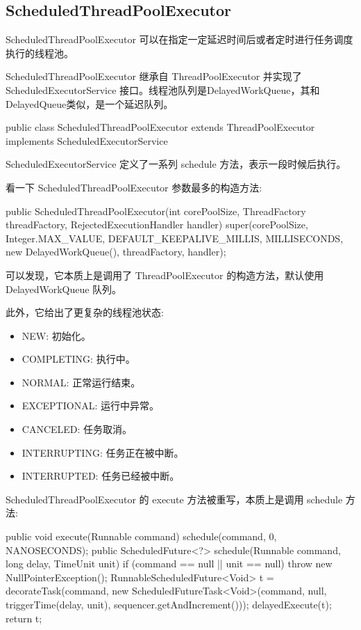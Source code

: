 \subsection{ScheduledThreadPoolExecutor}

ScheduledThreadPoolExecutor 可以在指定一定延迟时间后或者定时进行任务调度执行的线程池。

ScheduledThreadPoolExecutor 继承自 ThreadPoolExecutor 并实现了 ScheduledExecutorService 接口。线程池队列是DelayedWorkQueue，其和DelayedQueue类似，是一个延迟队列。

\begin{Java}
public class ScheduledThreadPoolExecutor extends ThreadPoolExecutor implements ScheduledExecutorService
\end{Java}

ScheduledExecutorService 定义了一系列 schedule 方法，表示一段时候后执行。

看一下 ScheduledThreadPoolExecutor 参数最多的构造方法:

\begin{Java}
public ScheduledThreadPoolExecutor(int corePoolSize, ThreadFactory threadFactory, RejectedExecutionHandler handler) {
    super(corePoolSize, Integer.MAX_VALUE, DEFAULT_KEEPALIVE_MILLIS, MILLISECONDS, new DelayedWorkQueue(), threadFactory, handler);
}
\end{Java}

可以发现，它本质上是调用了 ThreadPoolExecutor 的构造方法，默认使用 DelayedWorkQueue 队列。

此外，它给出了更复杂的线程池状态:
\begin{itemize}
    \item NEW: 初始化。
    \item COMPLETING: 执行中。
    \item NORMAL: 正常运行结束。
    \item EXCEPTIONAL: 运行中异常。
    \item CANCELED: 任务取消。
    \item INTERRUPTING: 任务正在被中断。
    \item INTERRUPTED: 任务已经被中断。
\end{itemize}

ScheduledThreadPoolExecutor 的 execute 方法被重写，本质上是调用 schedule 方法:

\begin{Java}
public void execute(Runnable command) {
    schedule(command, 0, NANOSECONDS);
}
public ScheduledFuture<?> schedule(Runnable command, long delay, TimeUnit unit) {
    if (command == null || unit == null)
        throw new NullPointerException();
    RunnableScheduledFuture<Void> t = decorateTask(command,
        new ScheduledFutureTask<Void>(command, null, triggerTime(delay, unit), sequencer.getAndIncrement()));
    delayedExecute(t);
    return t;
}
\end{Java}

\newpage